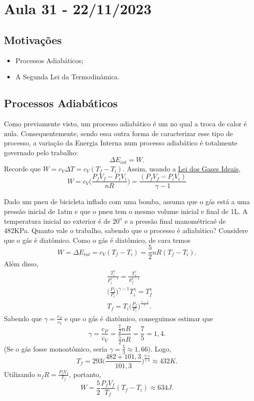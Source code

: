 \documentclass[phsyicsII_notes.tex]{subfiles}
\begin{document}
\section{Aula 31 - 22/11/2023}
\subsection{Motivações}
\begin{itemize}
	\item Processos Adiabáticos;
	\item A Segunda Lei da Termodinâmica.
\end{itemize}
\subsection{Processos Adiabáticos}
Como previamente visto, um processo adiabático é um no qual a troca de calor é nula. Consequentemente,
sendo essa outra forma de caracterizar esse tipo de processo, a variação da Energia Interna num processo
adiabático é totalmente governado pelo trabalho:
\[
	\Delta E_{int} = W.
\]
Recorde que \(W=c_{V}\Delta T = c_{V}(T_{f}-T_{i})\). Assim, usando a \hyperlink{pvnrt}{Lei dos Gases Ideais},
\[
	W = c_{V}\biggl(\frac{P_{f}V_{f}-P_{i}V_{i}}{nR}\biggr) = \frac{(P_{f}V_{f}-P_{i}V_{i})}{\gamma -1}
\]
\begin{example}
	Dado um pneu de bicicleta inflado com uma bomba, assuma que o gás está a uma pressão inicial de 1atm e que o pneu tem o mesmo volume
	inicial e final de 1L. A temperatura inicial no exterior é de \(20^{\mathrm{o}}\) e a pressão final manométrica\footnotemark[1]é de 482KPa. Quanto
	vale o trabalho, sabendo que o processo é adiabático? Considere que o gás é diatômico.
	Como o gás é diatômico, de cara temos
	\[
		W = \Delta E_{int} = c_{V}(T_{f}-T_{i}) = \frac{5}{2}nR(T_{f}-T_{i}).
	\]
	Além disso,
	\begin{align*}
		 & \frac{T_{i}^{\gamma }}{P_{i}^{\gamma -1}}=\frac{T_{f}^{\gamma }}{P_{f}^{\gamma -1}} \\
		 & \biggl(\frac{P_{f}}{P_{i}}\biggr)^{\gamma -1}T_{i}^{\gamma } = T_{f}^{\gamma }      \\
		 & T_{f}=T_{i}\biggl(\frac{P_{f}}{P_{i}}\biggr)^{\frac{\gamma -1}{\gamma }}.
	\end{align*}
	Sabendo que \(\gamma  = \frac{c_{P}}{c_{V}}\) e que o gás é diatômico, conseguimos estimar que
	\[
		\gamma  = \frac{c_{P}}{c_{V}} = \frac{\frac{7}{2}nR}{\frac{5}{2}nR} = \frac{7}{5} = 1,4.
	\]
	(Se o gás fosse monoatômico, seria \(\gamma = \frac{5}{3}\approx 1,66)\). Logo,
	\[
		T_{f} = 293 \biggl(\frac{482 + 101,3}{101,3}\biggr)^{\frac{0,4}{1,4}}\approx 432K.
	\]
	Utilizando \(n_{f}R = \frac{P_{f}V_{f}}{T_{f}}\), portanto,
	\[
		W = \frac{5}{2}\frac{P_{f}V_{f}}{T_{f}}(T_{f}-T_{i})\approx 634J.
	\]
\end{example}
\end{document}
